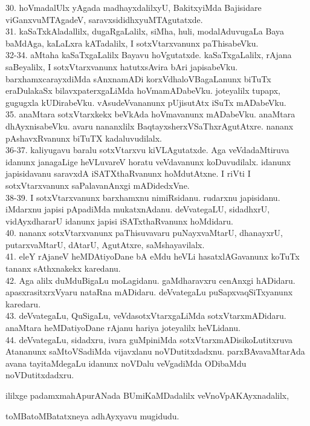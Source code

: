 \documentclass{article}
\begin{document}
30. hoVmadalUlx yAgada madhayxdalilxyU, BakitxyiMda Bajisidare viGanxvuMTAgadeV, saravxsididhxyuMTAgutatxde.\\
31. kaSaTxkAladallilx, dugaRgaLalilx, siMha, huli, modalAduvugaLa Baya baMdAga, kaLaLxra kATadalilx, I sotxVtarxvanunx paThisabeVku.\\
32-34. aMtaha kaSaTxgaLalilx Bayavu hoVgutatxde. kaSaTxgaLalilx, rAjana saBeyalilx, I sotxVtarxvanunx hatutxsAvira bAri japisabeVku. barxhamxcarayxdiMda sAnxnamADi korxVdhaloVBagaLanunx biTuTx eraDulakaSx bilavxpaterxgaLiMda hoVmamADabeVku. joteyalilx tupapx, gugugxla kUDirabeVku. vAsudeVvananunx pUjisutAtx iSuTx mADabeVku.\\
35. anaMtara sotxVtarxkekx beVkAda hoVmavanunx mADabeVku. anaMtara dhAyxnisabeVku. avaru nananxlilx BaqtayxsherxVSaThxrAgutAtxre. nananx pAshavxRvanunx biTuTX kadaluvudilalx.\\
36-37. kaliyugavu baralu sotxVtarxvu kiVLAgutatxde. Aga veVdadaMtiruva idanunx janagaLige heVLuvareV horatu veVdavanunx koDuvudilalx. idanunx japisidavanu saravxdA iSATXthaRvanunx hoMdutAtxne. I riVti I sotxVtarxvanunx saPalavanAnxgi mADidedxVne.\\
38-39. I sotxVtarxvanunx barxhamxnu nimiRsidanu. rudarxnu japisidanu. iMdarxnu japisi pApadiMda mukatxnAdanu. deVvategaLU, sidadhxrU, vidAyxdhararU idanunx japisi iSATxthaRvanunx hoMdidaru.\\
40. nananx sotxVtarxvanunx paThisuvavaru puNayxvaMtarU, dhanayxrU, putarxvaMtarU, dAtarU, AgutAtxre, saMshayavilalx.\\
41. eleY rAjaneV heMDAtiyoDane bA eMdu heVLi hasatxlAGavanunx koTuTx tananx sAthxnakekx karedanu.\\
42. Aga alilx duMduBigaLu moLagidanu. gaMdharavxru cenAnxgi hADidaru. apasxrasitxrxVyaru nataRna mADidaru. deVvategaLu puSapxvaqSiTxyanunx karedaru.\\
43. deVvategaLu, QuSigaLu, veVdasotxVtarxgaLiMda sotxVtarxmADidaru. anaMtara heMDatiyoDane rAjanu hariya joteyalilx heVLidanu.\\
44. deVvategaLu, sidadxru, ivara guMpiniMda sotxVtarxmADisikoLutitxruva Atananunx saMtoVSadiMda vijavxlanu noVDutitxdadxnu. parxBAvavaMtarAda avana tayitaMdegaLu idanunx noVDalu veVgadiMda ODibaMdu noVDutitxdadxru.

\begin{center}
ililxge padamxmahApurANada BUmiKaMDadalilx veVnoVpAKAyxnadalilx,
\end{center}

\begin{center}
toMBatoMBatatxneya adhAyxyavu mugidudu.
\end{center}
\end{document}

